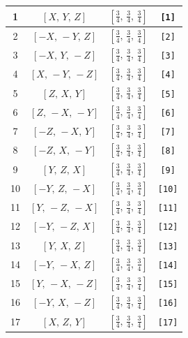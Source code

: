 \documentclass[fleqn,8pt]{jsarticle}
\begin{document}
\begin{longtable}{cccc}
1 & $\left[ X,\, Y,\, Z \right]$ & $\left[ \frac{3}{4},\, \frac{3}{4},\, \frac{3}{4} \right]$ & {\tt [1]} \\ \hline
2 & $\left[ - X,\, - Y,\, Z \right]$ & $\left[ \frac{3}{4},\, \frac{3}{4},\, \frac{3}{4} \right]$ & {\tt [2]} \\ \hline
3 & $\left[ - X,\, Y,\, - Z \right]$ & $\left[ \frac{3}{4},\, \frac{3}{4},\, \frac{3}{4} \right]$ & {\tt [3]} \\ \hline
4 & $\left[ X,\, - Y,\, - Z \right]$ & $\left[ \frac{3}{4},\, \frac{3}{4},\, \frac{3}{4} \right]$ & {\tt [4]} \\ \hline
5 & $\left[ Z,\, X,\, Y \right]$ & $\left[ \frac{3}{4},\, \frac{3}{4},\, \frac{3}{4} \right]$ & {\tt [5]} \\ \hline
6 & $\left[ Z,\, - X,\, - Y \right]$ & $\left[ \frac{3}{4},\, \frac{3}{4},\, \frac{3}{4} \right]$ & {\tt [6]} \\ \hline
7 & $\left[ - Z,\, - X,\, Y \right]$ & $\left[ \frac{3}{4},\, \frac{3}{4},\, \frac{3}{4} \right]$ & {\tt [7]} \\ \hline
8 & $\left[ - Z,\, X,\, - Y \right]$ & $\left[ \frac{3}{4},\, \frac{3}{4},\, \frac{3}{4} \right]$ & {\tt [8]} \\ \hline
9 & $\left[ Y,\, Z,\, X \right]$ & $\left[ \frac{3}{4},\, \frac{3}{4},\, \frac{3}{4} \right]$ & {\tt [9]} \\ \hline
10 & $\left[ - Y,\, Z,\, - X \right]$ & $\left[ \frac{3}{4},\, \frac{3}{4},\, \frac{3}{4} \right]$ & {\tt [10]} \\ \hline
11 & $\left[ Y,\, - Z,\, - X \right]$ & $\left[ \frac{3}{4},\, \frac{3}{4},\, \frac{3}{4} \right]$ & {\tt [11]} \\ \hline
12 & $\left[ - Y,\, - Z,\, X \right]$ & $\left[ \frac{3}{4},\, \frac{3}{4},\, \frac{3}{4} \right]$ & {\tt [12]} \\ \hline
13 & $\left[ Y,\, X,\, Z \right]$ & $\left[ \frac{3}{4},\, \frac{3}{4},\, \frac{3}{4} \right]$ & {\tt [13]} \\ \hline
14 & $\left[ - Y,\, - X,\, Z \right]$ & $\left[ \frac{3}{4},\, \frac{3}{4},\, \frac{3}{4} \right]$ & {\tt [14]} \\ \hline
15 & $\left[ Y,\, - X,\, - Z \right]$ & $\left[ \frac{3}{4},\, \frac{3}{4},\, \frac{3}{4} \right]$ & {\tt [15]} \\ \hline
16 & $\left[ - Y,\, X,\, - Z \right]$ & $\left[ \frac{3}{4},\, \frac{3}{4},\, \frac{3}{4} \right]$ & {\tt [16]} \\ \hline
17 & $\left[ X,\, Z,\, Y \right]$ & $\left[ \frac{3}{4},\, \frac{3}{4},\, \frac{3}{4} \right]$ & {\tt [17]} \\ \hline

\end{longtable}
\end{document}
